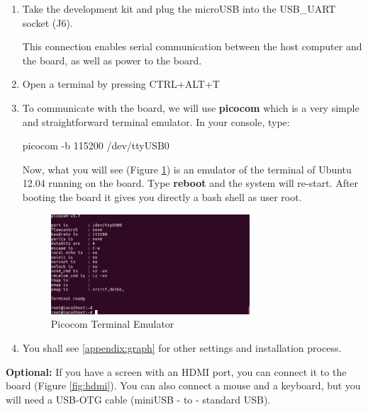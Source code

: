 \begin{enumerate}
    \item Take the development kit and plug the microUSB into the USB\_UART socket (J6).  

    This connection enables serial communication between the host computer and the board, as well as power to the board.
    
    \item Open a terminal by pressing CTRL+ALT+T
    \item To communicate with the board, we will use \textbf{picocom} which is a very simple and straightforward terminal emulator. In your console, type:
        \begin{tcolorbox}
            picocom -b 115200 /dev/ttyUSB0
        \end{tcolorbox}

    Now, what you will see (Figure \ref{fig:picocom}) is an emulator of the terminal of Ubuntu 12.04 running on the board.
    Type \textbf{reboot} and the system will re-start. After booting the board it gives you directly a bash shell as user root.


    \begin{figure}[h!]
    \centering
    \includegraphics[width=0.7\textwidth]{img/picocom.png}
    \caption{Picocom Terminal Emulator}
    \label{fig:picocom}
\end{figure}


    \item You shall see  \cref{appendix:graph} for other settings and installation process.
\end{enumerate}

{\color{red} \textbf{Optional:}} If you have a screen with an HDMI port, you can connect it to the board (Figure \ref{fig:hdmi}). You can also connect a mouse and a keyboard, but you will need a USB-OTG cable (miniUSB - to - standard USB).



